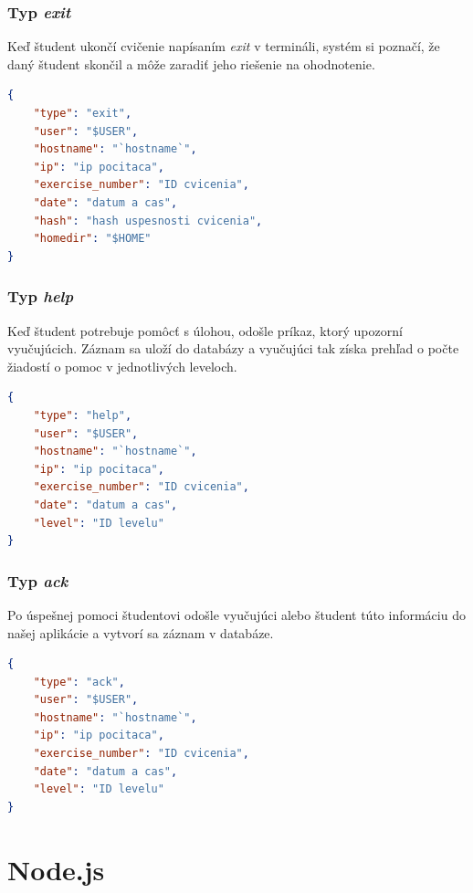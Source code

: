\subsubsection{Typ \textit{exit}}
\label{sec:zbieraniedat:exit}

Keď študent ukončí cvičenie napísaním \textit{exit} v termináli,
systém si poznačí, že daný študent skončil a môže zaradiť jeho riešenie
na ohodnotenie.

\begin{lstlisting}[language=json,firstnumber=1]
{
    "type": "exit",
    "user": "$USER",
    "hostname": "`hostname`",
    "ip": "ip pocitaca",
    "exercise_number": "ID cvicenia",
    "date": "datum a cas",
    "hash": "hash uspesnosti cvicenia",
    "homedir": "$HOME"
}
\end{lstlisting}

\subsubsection{Typ \textit{help}}
\label{sec:zbieraniedat:help}

Keď študent potrebuje pomôcť s úlohou, odošle príkaz, ktorý upozorní vyučujúcich.
Záznam sa uloží do databázy %
 a vyučujúci tak získa prehľad o počte žiadostí
o pomoc v jednotlivých leveloch.

\begin{lstlisting}[language=json,firstnumber=1]
{
    "type": "help",
    "user": "$USER",
    "hostname": "`hostname`",
    "ip": "ip pocitaca",
    "exercise_number": "ID cvicenia",
    "date": "datum a cas",
    "level": "ID levelu"
}
\end{lstlisting}

\subsubsection{Typ \textit{ack}}
\label{sec:zbieraniedat:ack}

Po úspešnej pomoci študentovi odošle vyučujúci alebo študent túto informáciu
do našej aplikácie a vytvorí sa záznam v databáze.

\begin{lstlisting}[language=json,firstnumber=1]
{
    "type": "ack",
    "user": "$USER",
    "hostname": "`hostname`",
    "ip": "ip pocitaca",
    "exercise_number": "ID cvicenia",
    "date": "datum a cas",
    "level": "ID levelu"
}
\end{lstlisting}

\section{Node.js}
\label{sec:nodejs}

